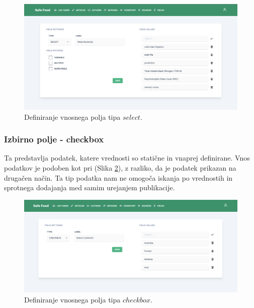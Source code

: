 \begin{figure}[h]
\begin{center}
\includegraphics[width=1\textwidth]{slike/type_select.png}
\end{center}
\caption{ Definiranje vnosnega polja tipa $select$. }
\label{type-select}
\end{figure}


\subsubsection{Izbirno polje - checkbox}
\label{type-checkbox-page}
Ta predstavlja podatek, katere vrednosti so statične in vnaprej definirane. Vnos podatkov je podoben kot pri  (Slika \ref{type-checkbox}), z razliko, da je podatek prikazan na drugačen način. Ta tip podatka nam ne omogoča iskanja po vrednostih in sprotnega dodajanja med samim urejanjem publikacije.

\begin{figure}[h]
\begin{center}
\includegraphics[width=1\textwidth]{slike/type_checkbox.png}
\end{center}
\caption{ Definiranje vnosnega polja tipa $checkbox$. }
\label{type-checkbox}
\end{figure}

